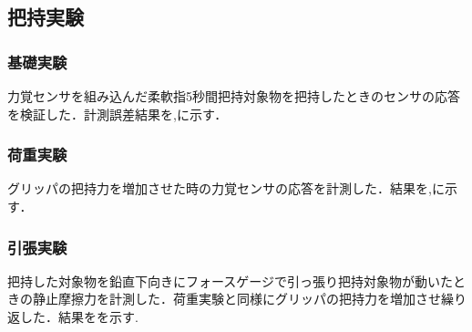 \newpage

\subsection{把持実験}
\subsubsection{基礎実験}
力覚センサを組み込んだ柔軟指5秒間把持対象物を把持したときのセンサの応答を検証した．計測誤差結果を,に示す．

\subsubsection{荷重実験}
グリッパの把持力を増加させた時の力覚センサの応答を計測した．結果を,に示す．

\subsubsection{引張実験}
把持した対象物を鉛直下向きにフォースゲージで引っ張り把持対象物が動いたときの静止摩擦力を計測した．荷重実験と同様にグリッパの把持力を増加させ繰り返した．結果をを示す.


